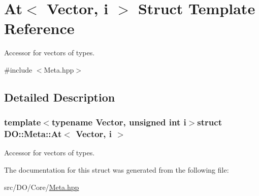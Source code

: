 \hypertarget{struct_d_o_1_1_meta_1_1_at}{\section{At$<$ Vector, i $>$ Struct Template Reference}
\label{struct_d_o_1_1_meta_1_1_at}
}


Accessor for vectors of types.  




{\ttfamily \#include $<$Meta.\-hpp$>$}



\subsection{Detailed Description}
\subsubsection*{template$<$typename Vector, unsigned int i$>$struct D\-O\-::\-Meta\-::\-At$<$ Vector, i $>$}

Accessor for vectors of types. 

The documentation for this struct was generated from the following file\-:\begin{DoxyCompactItemize}
\item 
src/\-D\-O/\-Core/\hyperlink{_meta_8hpp}{Meta.\-hpp}\end{DoxyCompactItemize}
